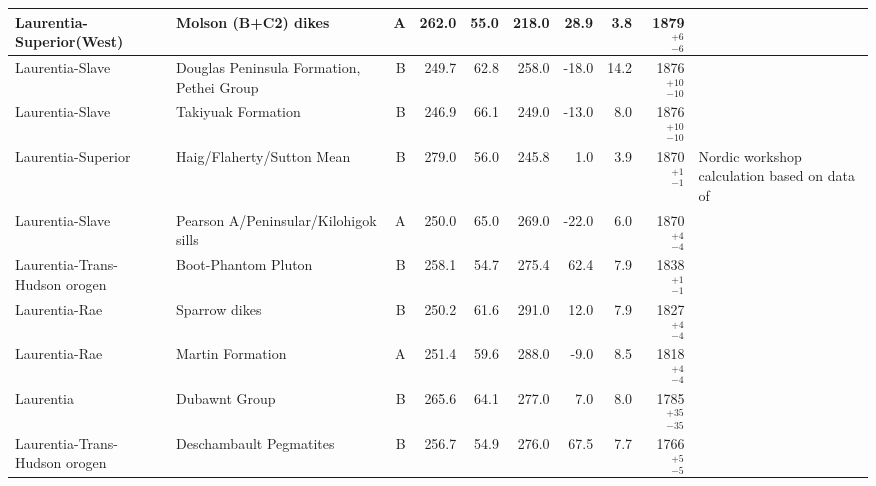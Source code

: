 \begin{longtable}{p{1 in}p{1 in}rrrrrrrp{1.5 in}}
      Laurentia-Superior(West) &                              Molson (B+C2) dikes &      A &     262.0 &      55.0 & 218.0 &  28.9 &       3.8 &     1879$^{+6}_{-6}$ &                                  \cite{Evans2010a} \\ \hline
               Laurentia-Slave &        Douglas Peninsula Formation, Pethei Group &      B &     249.7 &      62.8 & 258.0 & -18.0 &      14.2 &   1876$^{+10}_{-10}$ &                                \cite{Irving1979a} \\ \hline
               Laurentia-Slave &                               Takiyuak Formation &      B &     246.9 &      66.1 & 249.0 & -13.0 &       8.0 &   1876$^{+10}_{-10}$ &                                \cite{Irving1979a} \\ \hline
            Laurentia-Superior &                       Haig/Flaherty/Sutton Mean  &      B &     279.0 &      56.0 & 245.8 &   1.0 &       3.9 &     1870$^{+1}_{-1}$ &  Nordic workshop calculation based on data of \cite{Schmidt1980a, Schwarz1982a} \\ \hline
               Laurentia-Slave &             Pearson A/Peninsular/Kilohigok sills &      A &     250.0 &      65.0 & 269.0 & -22.0 &       6.0 &     1870$^{+4}_{-4}$ &                               \cite{Mitchell2010c} \\ \hline
 Laurentia-Trans-Hudson orogen &                              Boot-Phantom Pluton &      B &     258.1 &      54.7 & 275.4 &  62.4 &       7.9 &     1838$^{+1}_{-1}$ &                                 \cite{Symons1999a} \\ \hline
                 Laurentia-Rae &                                    Sparrow dikes &      B &     250.2 &      61.6 & 291.0 &  12.0 &       7.9 &     1827$^{+4}_{-4}$ &                                \cite{McGlynn1974a} \\ \hline
                 Laurentia-Rae &                                 Martin Formation &      A &     251.4 &      59.6 & 288.0 &  -9.0 &       8.5 &     1818$^{+4}_{-4}$ &                                  \cite{Evans1973a} \\ \hline
                     Laurentia &                                    Dubawnt Group &      B &     265.6 &      64.1 & 277.0 &   7.0 &       8.0 &   1785$^{+35}_{-35}$ &                                    \cite{Park1973a} \\ \hline
 Laurentia-Trans-Hudson orogen &                          Deschambault Pegmatites &      B &     256.7 &      54.9 & 276.0 &  67.5 &       7.7 &     1766$^{+5}_{-5}$ &                                 \cite{Symons2000a} \\ \hline

\end{longtable}
